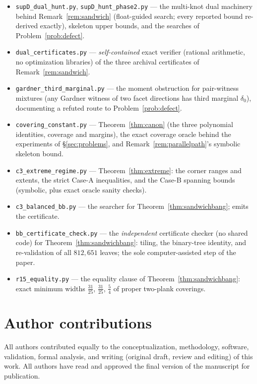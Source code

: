 \documentclass{aims}
\numberwithin{equation}{section}
\theoremstyle{plain}
\theoremstyle{definition}
\theoremstyle{remark}
\begin{document}
\begin{itemize}
\item\texttt{supD\_dual\_hunt.py}, \texttt{supD\_hunt\_phase2.py} ---
the multi-knot dual machinery behind Remark~\ref{rem:sandwich}
(float-guided search; every reported bound re-derived exactly), skeleton
upper bounds, and the searches of Problem~\ref{prob:defect}.
\item\texttt{dual\_certificates.py} --- \emph{self-contained} exact
verifier (rational arithmetic, no optimization libraries) of the three
archival certificates of Remark~\ref{rem:sandwich}.
\item\texttt{gardner\_third\_marginal.py} --- the moment obstruction for
pair-witness mixtures (any Gardner witness of two facet directions has
third marginal $\delta_0$), documenting a refuted route to
Problem~\ref{prob:defect}.
\item\texttt{covering\_constant.py} --- Theorem~\ref{thm:canon} (the three
polynomial identities, coverage and margins), the exact coverage oracle
behind the experiments of \S\ref{sec:problems}, and
Remark~\ref{rem:parallelpath}'s symbolic skeleton bound.
\item\texttt{c3\_extreme\_regime.py} --- Theorem~\ref{thm:extreme}: the corner
ranges and extents, the strict Case-A inequalities, and the Case-B spanning
bounds (symbolic, plus exact oracle sanity checks).
\item\texttt{c3\_balanced\_bb.py} --- the searcher for
Theorem~\ref{thm:sandwichbang}; emits the certificate.
\item\texttt{bb\_certificate\_check.py} --- the \emph{independent} certificate
checker (no shared code) for Theorem~\ref{thm:sandwichbang}: tiling, the
binary-tree identity, and re-validation of all $812{,}651$ leaves; the sole
computer-assisted step of the paper.
\item\texttt{r15\_equality.py} --- the equality clause of
Theorem~\ref{thm:sandwichbang}: exact minimum widths $\tfrac{31}{25}$,
$\tfrac{31}{25}$, $\tfrac54$ of proper two-plank coverings.
\end{itemize}

\section*{Author contributions}
All authors contributed equally to the conceptualization, methodology, software,
validation, formal analysis, and writing (original draft, review and editing) of
this work. All authors have read and approved the final version of the
manuscript for publication.
\end{document}
